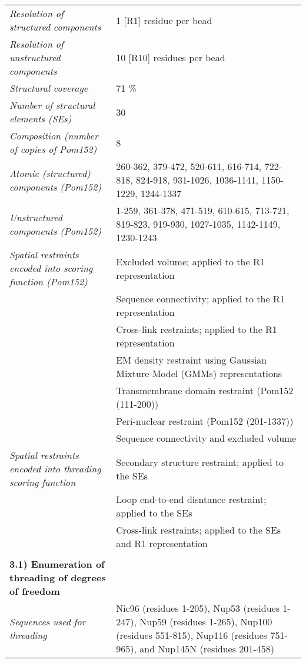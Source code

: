 \documentclass[8pt,a4paper]{article}
\begin{document}
\begin{longtable}{ p{} | p{} }
            \textit{Resolution of structured components} & 1 [R1] residue per bead\\
                \textit{Resolution of unstructured components} & 10 [R10] residues per bead\\
                \textit{Structural coverage} & 71 \%\\
                    \textit{Number of structural elements (SEs)} & 30\\
                \textit{Composition (number of copies of Pom152)} & 8\\
                \textit{Atomic (structured) components (Pom152)} & 260-362, 379-472, 520-611, 616-714, 722-818, 824-918, 931-1026, 1036-1141, 1150-1229, 1244-1337\\
                \textit{Unstructured components (Pom152)} & 1-259, 361-378, 471-519, 610-615, 713-721, 819-823, 919-930, 1027-1035, 1142-1149, 1230-1243\\
                \textit{Spatial restraints encoded into scoring function (Pom152)} & Excluded volume; applied to the R1 representation\\
            & Sequence connectivity; applied to the R1 representation \\
            & Cross-link restraints; applied to the R1 representation \\
            & EM density restraint using Gaussian Mixture Model (GMMs) representations \\
            & Transmembrane domain restraint (Pom152 (111-200)) \\
            & Peri-nuclear restraint (Pom152 (201-1337)) \\
            & Sequence connectivity and excluded volume \\
                \textit{Spatial restraints encoded into threading scoring function} & Secondary structure restraint; applied to the SEs\\
            & Loop end-to-end disntance restraint; applied to the SEs \\
            & Cross-link restraints; applied to the SEs and R1 representation \\
        

  &  \\
    \normalsize{\textbf{3.1) Enumeration of threading of degrees of freedom}} & \\
    \hline
            \textit{Sequences used for threading} & Nic96 (residues 1-205), Nup53 (residues 1-247), Nup59 (residues 1-265), Nup100 (residues 551-815), Nup116 (residues 751-965), and Nup145N (residues 201-458)\\
          

\end{longtable}
\end{document}
